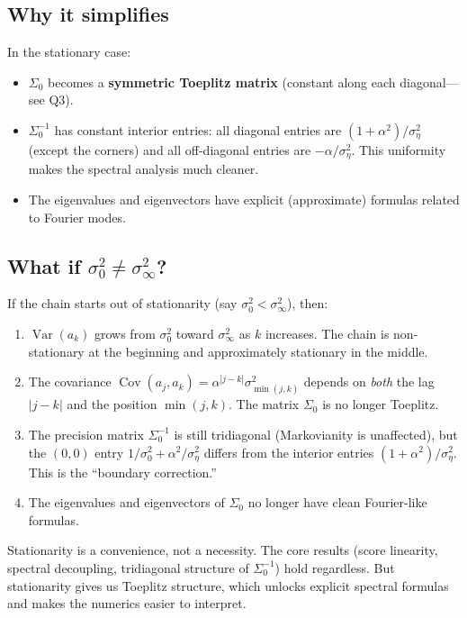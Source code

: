 \documentclass[11pt,a4paper]{article}
\newcommand{\Var}{\operatorname{Var}}
\newcommand{\Cov}{\operatorname{Cov}}
\newcommand{\sigeta}{\sigma_\eta^2}
\newcommand{\sigzero}{\sigma_0^2}
\newcommand{\siginf}{\sigma_\infty^2}
\begin{document}
\subsection{Why it simplifies}

In the stationary case:
\begin{itemize}[nosep]
  \item $\Sigma_0$ becomes a \textbf{symmetric Toeplitz matrix} (constant along each diagonal---see Q3).
  \item $\Sigma_0^{-1}$ has constant interior entries: all diagonal entries are $(1+\alpha^2)/\sigeta$ (except the corners) and all off-diagonal entries are $-\alpha/\sigeta$.  This uniformity makes the spectral analysis much cleaner.
  \item The eigenvalues and eigenvectors have explicit (approximate) formulas related to Fourier modes.
\end{itemize}

\subsection{What if $\sigzero \neq \siginf$?}

If the chain starts out of stationarity (say $\sigzero < \siginf$), then:
\begin{enumerate}[nosep]
  \item $\Var(a_k)$ grows from $\sigzero$ toward $\siginf$ as $k$ increases.  The chain is non-stationary at the beginning and approximately stationary in the middle.
  \item The covariance $\Cov(a_j, a_k) = \alpha^{|j-k|}\sigma^2_{\min(j,k)}$ depends on \emph{both} the lag $|j-k|$ and the position $\min(j,k)$.  The matrix $\Sigma_0$ is no longer Toeplitz.
  \item The precision matrix $\Sigma_0^{-1}$ is still tridiagonal (Markovianity is unaffected), but the $(0,0)$ entry $1/\sigzero + \alpha^2/\sigeta$ differs from the interior entries $(1+\alpha^2)/\sigeta$.  This is the ``boundary correction.''
  \item The eigenvalues and eigenvectors of $\Sigma_0$ no longer have clean Fourier-like formulas.
\end{enumerate}

\begin{intuitionbox}
Stationarity is a convenience, not a necessity.  The core results (score linearity, spectral decoupling, tridiagonal structure of $\Sigma_0^{-1}$) hold regardless.  But stationarity gives us Toeplitz structure, which unlocks explicit spectral formulas and makes the numerics easier to interpret.
\end{intuitionbox}
\end{document}
